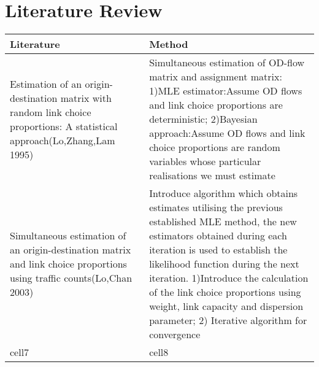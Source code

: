 \documentclass[a4paper]{article}
\begin{document}
\section{Literature Review}


\begin{center}
\begin{tabular}{ | p{7cm} | p{7cm}|  } 
\hline
Literature & Method \\
\hline
Estimation of an origin-destination matrix with random link choice proportions: A statistical approach(Lo,Zhang,Lam 1995) & 
Simultaneous estimation of OD-flow matrix and assignment matrix: 1)MLE estimator:Assume OD flows and link choice proportions are deterministic; 2)Bayesian approach:Assume OD flows and link choice proportions are random variables whose particular realisations we must estimate   \\ 
\hline
Simultaneous estimation of an origin-destination matrix and link choice proportions using traffic counts(Lo,Chan 2003) 
& 
Introduce algorithm which obtains estimates utilising the previous established MLE method, the new estimators obtained during each iteration is used to establish the likelihood function during the next iteration. 1)Introduce the calculation of the link choice proportions using weight, link capacity and dispersion parameter; 2) Iterative algorithm for convergence \\ 
\hline
cell7 & cell8  \\ 
\hline
\end{tabular}
\end{center}
\end{document}
